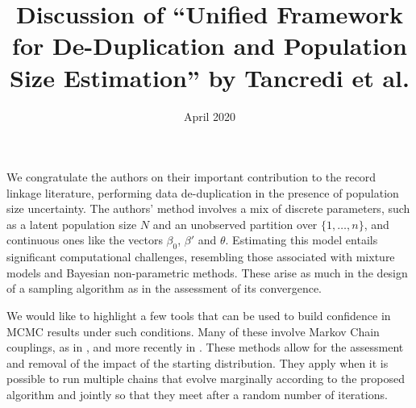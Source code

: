\documentclass[ba]{imsart}
\begin{document}
\date{April 2020}

\begin{frontmatter}
\title{Discussion of ``Unified Framework for De-Duplication and Population Size Estimation'' by Tancredi et al.}

\runtitle{}



\end{frontmatter}

We congratulate the authors on their important contribution to the record linkage literature, performing data de-duplication in the presence of population size uncertainty.
The authors' method involves a mix of discrete parameters, such as a latent population size $N$ and an unobserved partition over $\{1,\ldots,n\}$, and continuous ones like the vectors $\beta_0$, $\beta'$ and $\theta$.
Estimating this model entails significant computational challenges, resembling those associated with mixture models and Bayesian non-parametric methods. These arise as much in the design of a sampling algorithm as in the assessment of its convergence.

We would like to highlight a few tools that can be used to build confidence in MCMC results under such conditions. Many of these involve Markov Chain couplings,
as in \citet{valen_johnson_1996,johnson1998coupling},
and more recently in \citet{glynn2014exact,Nikooienejad2016,jacob2017unbiased,biswas2019estimating}.
These methods allow for the assessment and removal
of the impact of the starting distribution. They apply when
it is possible to run multiple chains that evolve  
marginally according to the proposed algorithm and jointly so that they meet after a random number of iterations. 
\end{document}
